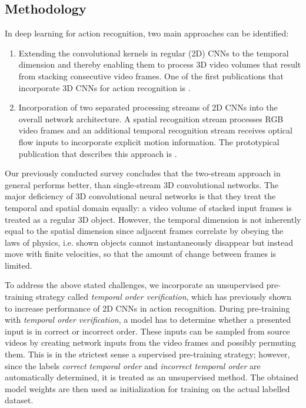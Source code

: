 \subsection{Methodology}
In deep learning for action recognition, two main approaches can be identified:
\begin{enumerate}
    \item
    Extending the convolutional kernels in regular (2D) CNNs to the temporal dimension and thereby enabling them to process 3D video volumes that result from stacking consecutive video frames.
    One of the first publications that incorporate 3D CNNs for action recognition is \cite{ji_3d_2013}.
    \item
    Incorporation of two separated processing streams of 2D CNNs into the overall network architecture. A spatial recognition stream processes RGB video frames and an additional temporal recognition stream receives optical flow inputs to incorporate explicit motion information. The prototypical publication that describes this approach is \cite{simonyan_two-stream_2014}.
\end{enumerate}

Our previously conducted survey\cite{schobel_evaluation_2017} concludes that the two-stream approach in general performs better, than single-stream 3D convolutional networks.
The major deficiency of 3D convolutional neural networks is that they treat the temporal and spatial domain equally:
a video volume of stacked input frames is treated as a regular 3D object.
However, the temporal dimension is not inherently equal to the spatial dimension since adjacent frames correlate by obeying the laws of physics, i.e. shown objects cannot instantaneously disappear but instead move with finite velocities, so that the amount of change between frames is limited.

To address the above stated challenges, we incorporate an unsupervised pre-training strategy called \textit{temporal order verification}, which has previously shown to increase performance of 2D CNNs in action recognition.
During pre-training with \textit{temporal order verification}, a model has to determine whether a presented input is in correct or incorrect order.
These inputs can be sampled from source videos by creating network inputs from the video frames and possibly permuting them.
This is in the strictest sense a supervised pre-training strategy;
however, since the labels \textit{correct temporal order} and \textit{incorrect temporal order} are automatically determined, it is treated as an unsupervised method.
The obtained model weights are then used as initialization for training on the actual labelled dataset.

